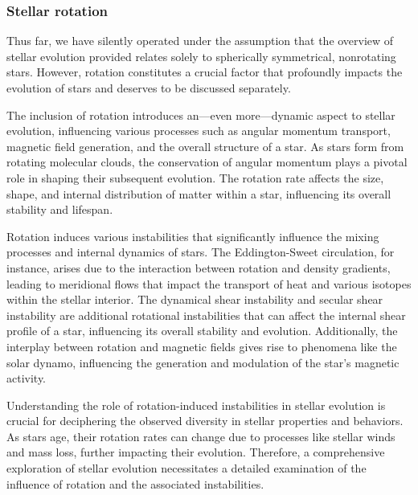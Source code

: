 \documentclass[main.tex]{subfiles}
\begin{document}
    

    \subsubsection{Stellar rotation}
    Thus far, we have silently operated under the assumption that the overview of stellar evolution provided relates solely to spherically symmetrical, nonrotating stars. However, rotation constitutes a crucial factor that profoundly impacts the evolution of stars and deserves to be discussed separately. 

    The inclusion of rotation introduces an---even more---dynamic aspect to stellar evolution, influencing various processes such as angular momentum transport, magnetic field generation, and the overall structure of a star. As stars form from rotating molecular clouds, the conservation of angular momentum plays a pivotal role in shaping their subsequent evolution. The rotation rate affects the size, shape, and internal distribution of matter within a star, influencing its overall stability and lifespan.

    Rotation induces various instabilities that significantly influence the mixing processes and internal dynamics of stars. The Eddington-Sweet circulation, for instance, arises due to the interaction between rotation and density gradients, leading to meridional flows that impact the transport of heat and various isotopes within the stellar interior. The dynamical shear instability and secular shear instability are additional rotational instabilities that can affect the internal shear profile of a star, influencing its overall stability and evolution. Additionally, the interplay between rotation and magnetic fields gives rise to phenomena like the solar dynamo, influencing the generation and modulation of the star's magnetic activity.

    Understanding the role of rotation-induced instabilities in stellar evolution is crucial for deciphering the observed diversity in stellar properties and behaviors. As stars age, their rotation rates can change due to processes like stellar winds and mass loss, further impacting their evolution. Therefore, a comprehensive exploration of stellar evolution necessitates a detailed examination of the influence of rotation and the associated instabilities.
\end{document}
